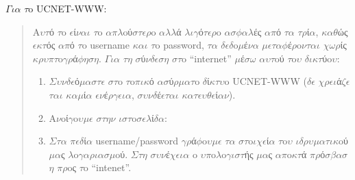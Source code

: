 \documentclass[a4paper,11pt,english]{sphinxmanual}
\begin{document}
\(\Gamma\)\(\iota\)\(\alpha\) \(\tau\)o UCNET-WWW:
\begin{quote}

A\(\upsilon\)\(\tau\)ό \(\tau\)o \(\epsilon\)ί\(\nu\)\(\alpha\)\(\iota\) \(\tau\)o \(\alpha\)\(\pi\)\(\lambda\)oύ\(\sigma\)\(\tau\)\(\epsilon\)\(\rho\)o \(\alpha\)\(\lambda\)\(\lambda\)ά \(\lambda\)\(\iota\)\(\gamma\)ό\(\tau\)\(\epsilon\)\(\rho\)o \(\alpha\)\(\sigma\)\(\phi\)\(\alpha\)\(\lambda\)ές \(\alpha\)\(\pi\)ό \(\tau\)\(\alpha\) \(\tau\)\(\rho\)ί\(\alpha\), \(\kappa\)\(\alpha\)\(\theta\)ώς  \(\epsilon\)\(\kappa\)\(\tau\)ός \(\alpha\)\(\pi\)ό \(\tau\)o username \(\kappa\)\(\alpha\)\(\iota\) \(\tau\)o password, \(\tau\)\(\alpha\) \(\delta\)\(\epsilon\)\(\delta\)o\(\mu\)έ\(\nu\)\(\alpha\)  \(\mu\)\(\epsilon\)\(\tau\)\(\alpha\)\(\phi\)έ\(\rho\)o\(\nu\)\(\tau\)\(\alpha\)\(\iota\) \(\chi\)\(\omega\)\(\rho\)ίς \(\kappa\)\(\rho\)\(\upsilon\)\(\pi\)\(\tau\)o\(\gamma\)\(\rho\)ά\(\phi\)\(\eta\)\(\sigma\)\(\eta\). \(\Gamma\)\(\iota\)\(\alpha\) \(\tau\)\(\eta\) \(\sigma\)ύ\(\nu\)\(\delta\)\(\epsilon\)\(\sigma\)\(\eta\) \(\sigma\)\(\tau\)o “internet” \(\mu\)έ\(\sigma\)\(\omega\) \(\alpha\)\(\upsilon\)\(\tau\)oύ \(\tau\)o\(\upsilon\) \(\delta\)\(\iota\)\(\kappa\)\(\tau\)ύo\(\upsilon\):
\begin{enumerate}
\item {} 
\(\Sigma\)\(\upsilon\)\(\nu\)\(\delta\)\(\epsilon\)ό\(\mu\)\(\alpha\)\(\sigma\)\(\tau\)\(\epsilon\) \(\sigma\)\(\tau\)o \(\tau\)o\(\pi\)\(\iota\)\(\kappa\)ό \(\alpha\)\(\sigma\)ύ\(\rho\)\(\mu\)\(\alpha\)\(\tau\)o \(\delta\)ί\(\kappa\)\(\tau\)\(\upsilon\)o UCNET-WWW (\(\delta\)\(\epsilon\) \(\chi\)\(\rho\)\(\epsilon\)\(\iota\)ά\(\zeta\)\(\epsilon\)\(\tau\)\(\alpha\)\(\iota\) \(\kappa\)\(\alpha\)\(\mu\)ί\(\alpha\) \(\epsilon\)\(\nu\)έ\(\rho\)\(\gamma\)\(\epsilon\)\(\iota\)\(\alpha\), \(\sigma\)\(\upsilon\)\(\nu\)\(\delta\)έ\(\epsilon\)\(\tau\)\(\alpha\)\(\iota\) \(\kappa\)\(\alpha\)\(\tau\)\(\epsilon\)\(\upsilon\)\(\theta\)\(\epsilon\)ί\(\alpha\)\(\nu\)).

\item {} 
A\(\nu\)oί\(\gamma\)o\(\upsilon\)\(\mu\)\(\epsilon\) \(\sigma\)\(\tau\)\(\eta\)\(\nu\) \(\iota\)\(\sigma\)\(\tau\)o\(\sigma\)\(\epsilon\)\(\lambda\)ί\(\delta\)\(\alpha\): 

\item {} 
\(\Sigma\)\(\tau\)\(\alpha\) \(\pi\)\(\epsilon\)\(\delta\)ί\(\alpha\) username/password \(\gamma\)\(\rho\)ά\(\phi\)o\(\upsilon\)\(\mu\)\(\epsilon\) \(\tau\)\(\alpha\) \(\sigma\)\(\tau\)o\(\iota\)\(\chi\)\(\epsilon\)ί\(\alpha\) \(\tau\)o\(\upsilon\) \(\iota\)\(\delta\)\(\rho\)\(\upsilon\)\(\mu\)\(\alpha\)\(\tau\)\(\iota\)\(\kappa\)oύ \(\mu\)\(\alpha\)ς \(\lambda\)o\(\gamma\)\(\alpha\)\(\rho\)\(\iota\)\(\alpha\)\(\sigma\)\(\mu\)oύ. \(\Sigma\)\(\tau\)\(\eta\) \(\sigma\)\(\upsilon\)\(\nu\)έ\(\chi\)\(\epsilon\)\(\iota\)\(\alpha\) o \(\upsilon\)\(\pi\)o\(\lambda\)o\(\gamma\)\(\iota\)\(\sigma\)\(\tau\)ής \(\mu\)\(\alpha\)ς \(\alpha\)\(\pi\)o\(\kappa\)\(\tau\)ά \(\pi\)\(\rho\)ό\(\sigma\)\(\beta\)\(\alpha\)\(\sigma\)\(\eta\) \(\pi\)\(\rho\)oς \(\tau\)o “intenet”.

\end{enumerate}
\end{quote}
\end{document}
